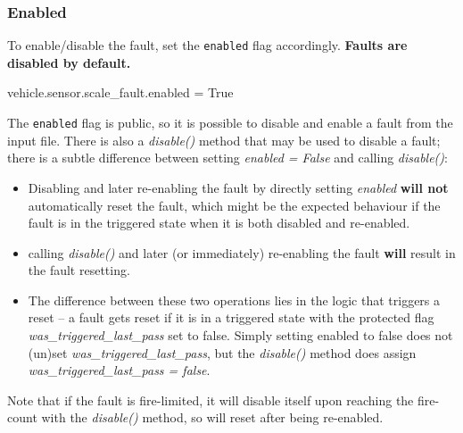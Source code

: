 \documentclass[11pt,fleqn]{report}
\begin{document}
\subsubsection{Enabled} \label{sec:UG:DirectInstantiation:Config:Enabled}
To enable/disable the fault, set the \verb"enabled" flag accordingly.
\textbf{Faults are disabled by default.}
\begin{codePython}
 vehicle.sensor.scale_fault.enabled = True
\end{codePython}

The \verb'enabled' flag is public, so it is possible to disable and enable a
fault from the input file. There is also a \textit{disable()} method that may be
used to disable a fault; there is a subtle difference between setting
\textit{enabled = False} and calling \textit{disable()}:
\begin{itemize}
 \item Disabling and later re-enabling the fault by directly setting
   \textit{enabled} \textbf{will not} automatically reset the fault, which might
   be the expected behaviour if the fault is in the triggered state when it is
   both disabled and re-enabled.
  \item calling \textit{disable()} and later (or immediately) re-enabling the
    fault \textbf{will} result in the fault resetting.
  \item The difference between these two operations lies in the logic that
    triggers a reset -- a fault gets reset if it is in a triggered state with
    the protected flag \textit{was\_triggered\_last\_pass} set to false. Simply
    setting enabled to false does not (un)set
    \textit{was\_triggered\_last\_pass},
    but the \textit{disable()} method does assign
    \textit{was\_triggered\_last\_pass = false}.
\end{itemize}

Note that if the fault is fire-limited, it will disable itself upon reaching the
fire-count with the \textit{disable()} method, so will reset after being
re-enabled.
\end{document}
